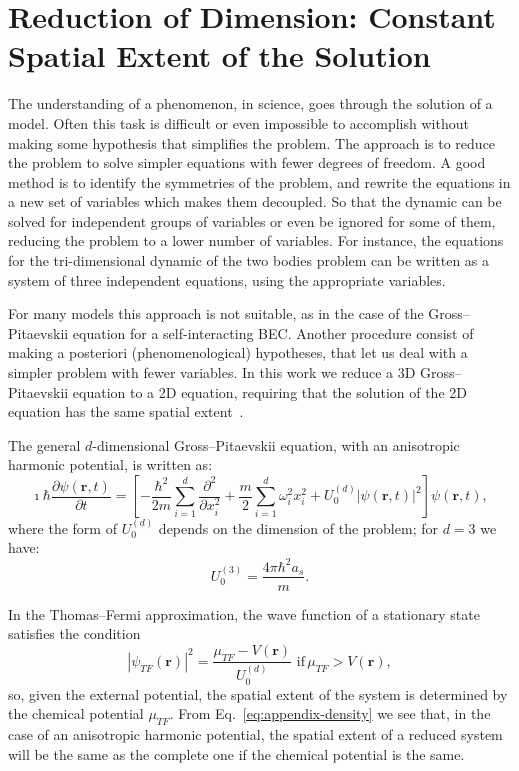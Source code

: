 \chapter{Reduction of Dimension: Constant Spatial Extent of the Solution}
 \label{App:A}
The understanding of a phenomenon, in science, goes through the solution of a model. Often this task is difficult or even impossible to accomplish without making some hypothesis that simplifies the problem. The approach is to reduce the problem to solve simpler equations with fewer degrees of freedom. A good method is to identify the symmetries of the problem, and rewrite the equations in a new set of variables which makes them decoupled. So that the dynamic can be solved for independent groups of variables or even be ignored for some of them, reducing the problem to a lower number of variables. For instance, the equations for the tri-dimensional dynamic of the two bodies problem can be written as a system of three independent equations, using the appropriate variables.

For many models this approach is not suitable, as in the case of the Gross--Pitaevskii equation for a self-interacting BEC. Another procedure consist of making a posteriori (phenomenological) hypotheses, that let us deal with a simpler problem with fewer variables. In this work we reduce a 3D Gross--Pitaevskii equation to a 2D equation, requiring that the solution of the 2D equation has the same spatial extent~\citep{PietroMassignan}.

The general $d$-dimensional Gross--Pitaevskii equation, with an anisotropic harmonic potential, is written as:
\begin{equation}
\imath \hbar \frac{\partial \psi(\textbf{r}, t)}{\partial t} = \left[ - \frac{\hbar^2}{2m} \sum_{i=1}^d \frac{\partial^2}{\partial x_i^2} + \frac{m}{2} \sum_{i=1}^d \omega_i^2 x_i^2 + U_0^{(d)} |\psi(\textbf{r}, t)|^2 \right] \psi(\textbf{r}, t),
\end{equation}
where the form of $U_0^{(d)}$ depends on the dimension of the problem; for $d=3$ we have:
\begin{equation}
U_0^{(3)} = \frac{4\pi \hbar^2 a_s}{m}.
\end{equation}

In the Thomas--Fermi approximation, the wave function of a stationary state satisfies the condition
\begin{equation} \label{eq:appendix-density}
|\psi_{TF}(\textbf{r})|^2 = \frac{\mu_{TF} - V(\textbf{r})}{U_0^{(d)}} \,\, \mathrm{if} \, \mu_{TF}  > V(\textbf{r}),
\end{equation}
so, given the external potential, the spatial extent of the system is determined by the chemical potential $\mu_{TF}$. From Eq.~\eqref{eq:appendix-density} we see that, in the case of an anisotropic harmonic potential, the spatial extent of a reduced system will be the same as the complete one if the chemical potential is the same.

